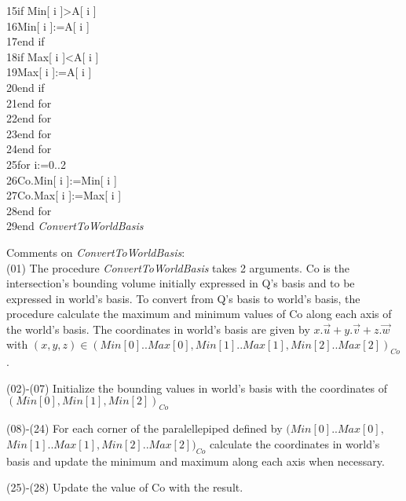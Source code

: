 \documentclass[12pt, a4paper]{article}
\begin{document}
\begin{ttfamily}
15\quad\quad\quad\quad\quad\quad if Min[ i ]>A[ i ]\\
16\quad\quad\quad\quad\quad\quad\quad Min[ i ]:=A[ i ]\\
17\quad\quad\quad\quad\quad\quad end if\\
18\quad\quad\quad\quad\quad\quad if Max[ i ]<A[ i ]\\
19\quad\quad\quad\quad\quad\quad\quad Max[ i ]:=A[ i ]\\
20\quad\quad\quad\quad\quad\quad end if\\
21\quad\quad\quad\quad\quad end for\\
22\quad\quad\quad\quad end for\\
23\quad\quad\quad end for\\
24\quad\quad end for\\
25\quad\quad for i:=0..2\\
26\quad\quad\quad Co.Min[ i ]:=Min[ i ]\\
27\quad\quad\quad Co.Max[ i ]:=Max[ i ]\\
28\quad\quad end for\\
29\quad end {\em ConvertToWorldBasis}\\
\end{ttfamily}

Comments on {\em ConvertToWorldBasis}:\\

(01) The procedure {\em ConvertToWorldBasis} takes 2 arguments. Co is the intersection's bounding volume initially expressed in Q's basis and to be expressed in world's basis. To convert from Q's basis to world's basis, the procedure calculate the maximum and minimum values of Co along each axis of the world's basis. The coordinates in world's basis are given by $x.\vec{u}+y.\vec{v}+z.\vec{w}$ with $(x, y, z)\in(Min[0]..Max[0],Min[1]..Max[1],Min[2]..Max[2])_{Co}$.

(02)-(07) Initialize the bounding values in world's basis with the coordinates of $(Min[0],Min[1],Min[2])_{Co}$

(08)-(24) For each corner of the paralellepiped defined by $(Min[0]..Max[0],$ $Min[1]..Max[1],Min[2]..Max[2])_{Co}$ calculate the coordinates in world's basis and update the minimum and maximum along each axis when necessary.

(25)-(28) Update the value of Co with the result.\\
\end{document}
